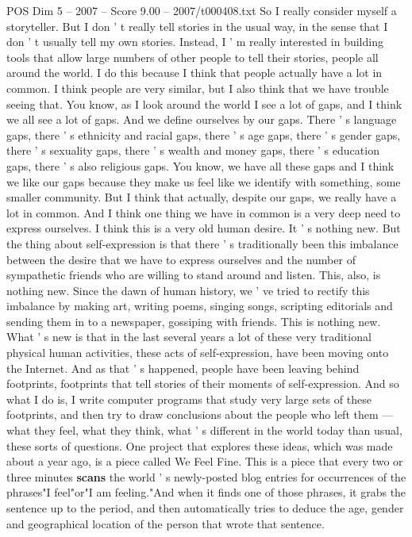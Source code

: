 \begin{textsample}{POS Dim 5 – 2007 – Score 9.00 – 2007/t000408.txt}  \label{ex:f5_pos_025}
So I really consider myself a storyteller.
But I don ' t really tell stories in the usual way, in the sense that I don ' t usually tell my own stories.
Instead, I ' m really interested in building tools that allow large numbers of other people to tell their stories, people all around the world.
I do this because I think that people actually have a lot in common.
I think people are very similar, but I also think that we have trouble seeing that.
You know, as I look around the world I see a lot of gaps, and I think we all see a lot of gaps.
And we define ourselves by our gaps.
There ' s language gaps, there ' s ethnicity and racial gaps, there ' s age gaps, there ' s gender gaps, there ' s sexuality gaps, there ' s wealth and money gaps, there ' s education gaps, there ' s also religious gaps.
You know, we have all these gaps and I think we like our gaps because they make us feel like we identify with something, some smaller community.
But I think that actually, despite our gaps, we really have a lot in common.
And I think one thing we have in common is a very deep need to express ourselves.
I think this is a very old human desire.
It ' s nothing new.
But the thing about self-expression is that there ' s traditionally been this imbalance between the desire that we have to express ourselves and the number of sympathetic friends who are willing to stand around and listen.
This, also, is nothing new.
Since the dawn of human history, we ' ve tried to rectify this imbalance by making art, writing poems, singing songs, scripting editorials and sending them in to a newspaper, gossiping with friends.
This is nothing new.
What ' s new is that in the last several years a lot of these very traditional physical human activities, these acts of self-expression, have been moving onto the Internet.
And as that ' s happened, people have been leaving behind footprints, footprints that tell stories of their moments of self-expression.
And so what I do is, I write computer programs that study very large sets of these footprints, and then try to draw conclusions about the people who left them — what they feel, what they think, what ' s different in the world today than usual, these sorts of questions.
One project that explores these ideas, which was made about a year ago, is a piece called We Feel Fine.
This is a piece that every two or three minutes \textbf{scans} the world ' s newly-posted blog entries for occurrences of the phrases"I feel"or"I am feeling."And when it finds one of those phrases, it grabs the sentence up to the period, and then automatically tries to deduce the age, gender and geographical location of the person that wrote that sentence.

\end{textsample}
